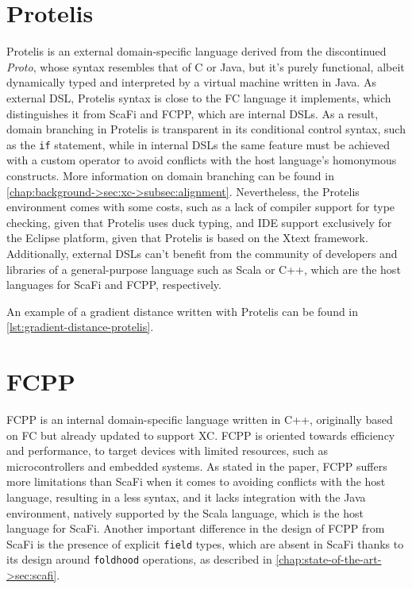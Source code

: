 \section{Protelis} \label{chap:state-of-the-art->sec:protelis}

Protelis is an external domain-specific language derived from the discontinued \textit{Proto}, whose syntax resembles that of C or Java, but it's purely functional, albeit dynamically typed and interpreted by a virtual machine written in Java\cite{protelis}.
%
As external \ac{DSL}, Protelis syntax is close to the \ac{FC} language it implements, which distinguishes it from ScaFi and FCPP, which are internal \acp{DSL}.
%
As a result, domain branching in Protelis is transparent in its conditional control syntax, such as the \texttt{if} statement, while in internal \acp{DSL} the same feature must be achieved with a custom operator to avoid conflicts with the host language's homonymous constructs.
%
More information on domain branching can be found in \cref{chap:background->sec:xc->subsec:alignment}.
%
Nevertheless, the Protelis environment comes with some costs, such as a lack of compiler support for type checking, given that Protelis uses duck typing, and IDE support exclusively for the Eclipse platform, given that Protelis is based on the Xtext framework\cite{xtext}.
%
Additionally, external \acp{DSL} can't benefit from the community of developers and libraries of a general-purpose language such as Scala or C++, which are the host languages for ScaFi and FCPP, respectively.

An example of a gradient distance written with Protelis can be found in \cref{lst:gradient-distance-protelis}.




\section{FCPP} \label{chap:state-of-the-art->sec:fcpp}

FCPP is an internal domain-specific language written in C++, originally based on \ac{FC} but already updated to support \ac{XC}\cite{xc}.
%
FCPP is oriented towards efficiency and performance, to target devices with limited resources, such as microcontrollers and embedded systems\cite{fcpp}.
%
As stated in the paper, FCPP suffers more limitations than ScaFi when it comes to avoiding conflicts with the host language, resulting in a less  syntax, and it lacks integration with the Java environment, natively supported by the Scala language, which is the host language for ScaFi\cite{fcpp}.
%
Another important difference in the design of FCPP from ScaFi is the presence of explicit \texttt{field} types, which are absent in ScaFi thanks to its design around \texttt{foldhood} operations, as described in \cref{chap:state-of-the-art->sec:scafi}.

